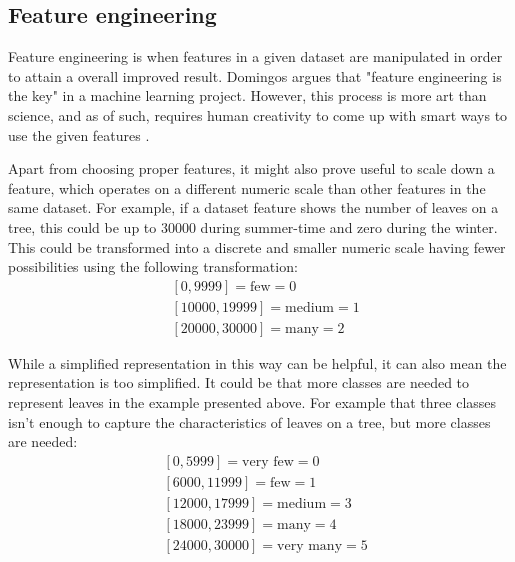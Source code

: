 	\subsection{Feature engineering}
	Feature engineering is when features in a given dataset are manipulated in order to attain a overall improved result. Domingos \cite{ARTICLE:3} argues that "feature engineering is the key" in a machine learning project. However, this process is more art than science, and as of such, requires human creativity to come up with smart ways to use the given features \cite{BOOK:9}. 

	Apart from choosing proper features, it might also prove useful to scale down a feature, which operates on a different numeric scale than other features in the same dataset. For example, if a dataset feature shows the number of leaves on a tree, this could be up to 30000 during summer-time and zero during the winter. This could be transformed into a discrete and smaller numeric scale having fewer possibilities using the following transformation: 
\begin{align*} 
	& [0, 9999] = \mbox{few} = 0 \\
	& [10000, 19999] = \mbox{medium} = 1 \\
	& [20000, 30000] = \mbox{many} = 2 
\end{align*}
	
	While a simplified representation in this way can be helpful, it can also mean the representation is too simplified. It could be that more classes are needed to represent leaves in the example presented above. For example that three classes isn't enough to capture the characteristics of leaves on a tree, but more classes are needed:
\begin{align*} 
	& [0, 5999] = \mbox{very few} = 0 \\
	& [6000, 11999] = \mbox{few} = 1 \\ 
	& [12000, 17999] = \mbox{medium} = 3 \\
	& [18000, 23999] = \mbox{many} = 4 \\
	& [24000, 30000] = \mbox{very many} = 5 
\end{align*}





